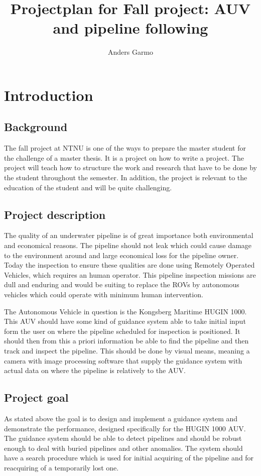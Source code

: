 \documentclass[a4paper,10pt]{article}
\title{Projectplan for Fall project: AUV and pipeline following}
\author{Anders Garmo}
\begin{document}
\maketitle
\newpage

\tableofcontents

\newpage

\section{Introduction}

	\subsection{Background}
	The fall project at NTNU is one of the ways to prepare the master student for the challenge of a master thesis. It is a project on how to write a project. The project will teach how to structure the work and research that have to be done by the student throughout the semester. In addition, the project is relevant to the education of the student and will be quite challenging.
	
	
	\subsection{Project description}
	The quality of an underwater pipeline is of great importance both environmental and economical reasons. The pipeline should not leak which could cause damage to the environment around and large economical loss for the pipeline owner. Today the inspection to ensure these qualities are done using Remotely Operated Vehicles, which requires an human operator. This pipeline inspection missions are dull and enduring and would be suiting to replace the ROVs by autonomous vehicles which could operate with minimum human intervention.
	
	The Autonomous Vehicle in question is the Kongsberg Maritime HUGIN 1000. This AUV should have some kind of guidance system able to take initial input form the user on where the pipeline scheduled for inspection is positioned. It should then from this a priori information be able to find the pipeline and then track and inspect the pipeline. This should be done by visual means, meaning a camera with image processing software that supply the guidance system with actual data on where the pipeline is relatively to the AUV.
	
	\subsection{Project goal}
	As stated above the goal is to design and implement a guidance system and demonstrate the performance, designed specifically for the HUGIN 1000 AUV. The guidance system should be able to detect pipelines and should be robust enough to deal with buried pipelines and other anomalies. The system should have a search procedure which is used for initial acquiring of the pipeline and for reacquiring of a temporarily lost one. 
\end{document}
